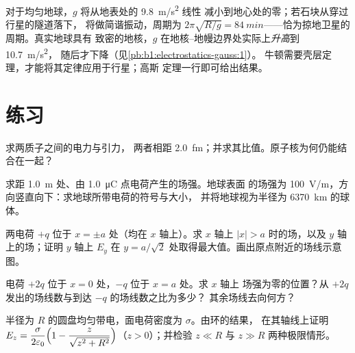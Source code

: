\begin{example}[地球内部]\label{ex:b1:electrostatics-gauss:earth}
对于均匀地球，$g$ 将从地表处的 \qty{9.8}{m/s^2} 线性
减小到地心处的零；若石块从穿过行星的隧道落下，
将做简谐振动，周期为 $2\pi\sqrt{R/g} =
\qty{84}{min}$——恰为掠地卫星的周期。真实地球具有
致密的地核，$g$ 在地核–地幔边界处实际上\emph{升高}到 \qty{10.7}{m/s^2}，
随后才下降（见\cref{pb:b1:electrostatics-gauss:1}）。
牛顿需要壳层定理，才能将其定律应用于行星；高斯
定理一行即可给出结果。
\end{example}

\section{练习}

\begin{exercise}[$\star$]\label{exo:b1:electrostatics-gauss:1}
求两质子之间的电力与引力，
两者相距 \qty{2.0}{fm}；并求其比值。原子核为何仍能结合在一起？
\end{exercise}

\begin{exercise}[$\star$]\label{exo:b1:electrostatics-gauss:2}
求距 \qty{1.0}{m} 处、由 \qty{1.0}{\micro C} 点电荷产生的场强。地球表面
的场强为 \qty{100}{V/m}，方向竖直向下：求地球所带电荷的符号与大小，
并将地球视为半径为 \qty{6370}{km} 的球体。
\end{exercise}

\begin{exercise}[$\star$]\label{exo:b1:electrostatics-gauss:3}
两电荷 $+q$ 位于 $x = \pm a$ 处（均在 $x$ 轴上）。求 $x$ 轴上
$|x| > a$ 时的场，以及 $y$ 轴上的场；证明 $y$ 轴上 $E_y$
在 $y = a/\sqrt2$ 处取得最大值。画出原点附近的场线示意图。
\end{exercise}

\begin{exercise}[$\star$]\label{exo:b1:electrostatics-gauss:4}
电荷 $+2q$ 位于 $x = 0$ 处，$-q$ 位于 $x = a$ 处。求 $x$ 轴上
场强为零的位置？从 $+2q$ 发出的场线数与到达 $-q$ 的场线数之比为多少？
其余场线去向何方？
\end{exercise}

\begin{exercise}[$\star\star$]\label{exo:b1:electrostatics-gauss:5}
半径为 $R$ 的圆盘均匀带电，面电荷密度为 $\sigma$。由环的结果，
在其轴线上证明 $E_z = \dfrac{\sigma}{2\varepsilon_0}\Bigl(1 - \dfrac{z}{\sqrt{z^2 +
R^2}}\Bigr)$（$z > 0$）；并检验 $z \ll R$ 与 $z \gg R$ 两种极限情形。
\end{exercise}

